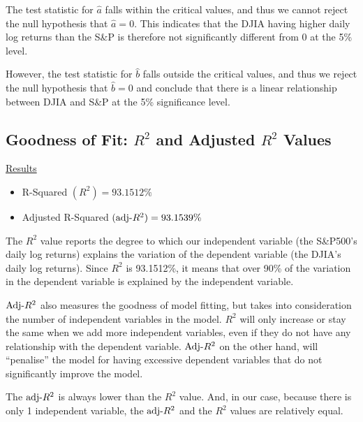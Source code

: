 \documentclass[a4paper]{article}
\begin{document}
	The test statistic for $\hat{a}$ falls within the critical values, and thus we cannot reject the null hypothesis that $\hat{a}=0$. This indicates that the DJIA having higher daily log returns than the S\&P is therefore not significantly different from 0 at the 5\% level.  
	
	However, the test statistic for $\hat{b}$ falls outside the critical values, and thus we reject the null hypothesis that $\hat{b}=0$ and conclude that there is a linear relationship between DJIA and S\&P at the 5\% significance level. 
	
	
	\subsection{Goodness of Fit: $R^2$ and Adjusted $R^2$ Values}
	\underline{Results}
	\begin{itemize}[nosep]
		\item R-Squared $(R^2) = 93.1512\%$
		\item Adjusted R-Squared $(\textnormal{adj-}R^2) = 93.1539\%$
	\end{itemize}

	The $R^2$ value reports the degree to which our independent variable (the S\&P500's daily log returns) explains the variation of the dependent variable (the DJIA's daily log returns). Since $R^2$ is 93.1512\%, it means that over 90\% of the variation in the dependent variable is explained by the independent variable.
	
	$\textnormal{Adj-}R^2$ also measures the goodness of model fitting, but takes into consideration the number of independent variables in the model. $R^2$ will only increase or  stay the same when we add more independent variables, even if they do not have any relationship with the dependent variable. $\textnormal{Adj-}R^2$ on the other hand, will ``penalise'' the model for having excessive dependent variables that do not significantly improve the model. 
	
	The $\textnormal{adj-}R^2$ is always lower than the $R^2$ value. And, in our case, because there is only 1 independent variable, the $\textnormal{adj-}R^2$ and the $R^2$ values are relatively equal.
	
\end{document}
